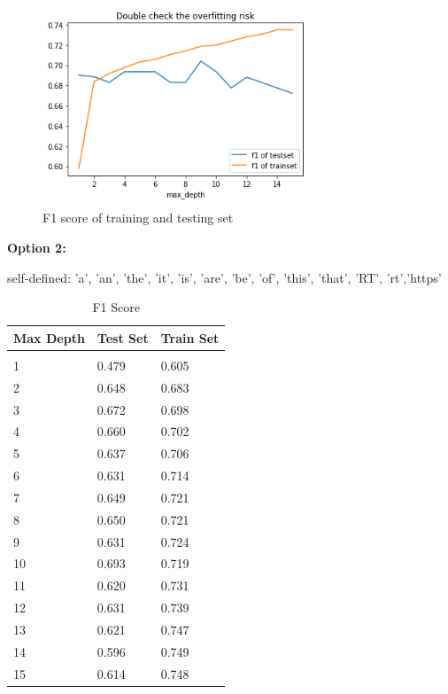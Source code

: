 \documentclass{article} %
\begin{document}
\begin{figure}[H]
	\centering
	\includegraphics[height=6cm, width=8cm]{2.png}
	\caption{F1 score of training and testing set}
\end{figure}


\textbf{Option 2: }

self-defined: {'a', 'an', 'the', 'it', 'is', 'are', 'be', 'of', 'this', 'that', 'RT', 'rt','https'}


\begin{table}[H]
	\caption{F1 Score}
	\label{sample-table}
	\begin{center}
		\begin{tabular}{|l|l|l|}
			\multicolumn{1}{c}{\bf Max Depth}  
			&\multicolumn{1}{c}{\bf Test Set}
			&\multicolumn{1}{c}{\bf Train Set}
			\\ \hline & &  \\
			1        &0.479 &0.605	 \\
			2        &0.648	&0.683	  \\
			3        &0.672	&0.698	 \\
			4        &0.660	&0.702	 \\
			5        &0.637	&0.706 \\
			6        &0.631 &0.714   \\
			7        &0.649 &0.721   \\
			8        &0.650 &0.721   \\
			9        &0.631 &0.724    \\
			10       &0.693  &0.719    \\
			11       &0.620  &0.731   \\
			12       &0.631 &0.739  \\
			13       &0.621 &0.747  \\
			14       &0.596 &0.749  \\
			15       &0.614 &0.748  \\
			\hline
		\end{tabular}
	\end{center}
\end{table}
\end{document}

